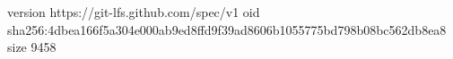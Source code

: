 version https://git-lfs.github.com/spec/v1
oid sha256:4dbea166f5a304e000ab9ed8ffd9f39ad8606b1055775bd798b08bc562db8ea8
size 9458
